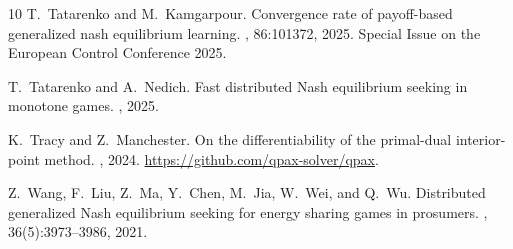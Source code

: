 \documentclass[11pt, a4paper]{article}
\theoremstyle{remark}
\theoremstyle{plain}
\begin{document}
\begin{thebibliography}{10}
T.~Tatarenko and M.~Kamgarpour.
\newblock Convergence rate of payoff-based generalized nash equilibrium learning.
, 86:101372, 2025.
\newblock Special Issue on the European Control Conference 2025.

T.~Tatarenko and A.~Nedich.
\newblock Fast distributed {Nash} equilibrium seeking in monotone games.
, 2025.

K.~Tracy and Z.~Manchester.
\newblock On the differentiability of the primal-dual interior-point method.
, 2024.
\newblock \url{https://github.com/qpax-solver/qpax}.

Z.~Wang, F.~Liu, Z.~Ma, Y.~Chen, M.~Jia, W.~Wei, and Q.~Wu.
\newblock Distributed generalized {N}ash equilibrium seeking for energy sharing games in prosumers.
, 36(5):3973--3986, 2021.

\end{thebibliography}
\end{document}
